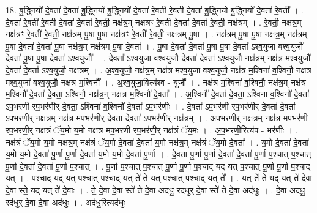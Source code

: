 \documentclass[17pt]{extarticle}
\begin{document}
18. बु॒द्ध्नियो॑ दे॒वता॑ दे॒वता॑ बु॒द्ध्नियो॑ बु॒द्ध्नियो॑ दे॒वता॑ रे॒वती॑ रे॒वती॑ दे॒वता॑ बु॒द्ध्नियो॑ बु॒द्ध्नियो॑ दे॒वता॑ रे॒वती᳚ । . दे॒वता॑ रे॒वती॑ रे॒वती॑ दे॒वता॑ दे॒वता॑ रे॒वती॒ नक्ष॑त्र॒म् नक्ष॑त्रꣳ रे॒वती॑ दे॒वता॑ दे॒वता॑ रे॒वती॒ नक्ष॑त्रम् । . रे॒वती॒ नक्ष॑त्र॒म् नक्ष॑त्रꣳ रे॒वती॑ रे॒वती॒ नक्ष॑त्रम् पू॒षा पू॒षा नक्ष॑त्रꣳ रे॒वती॑ रे॒वती॒ नक्ष॑त्रम् पू॒षा । . नक्ष॑त्रम् पू॒षा पू॒षा नक्ष॑त्र॒म् नक्ष॑त्रम् पू॒षा दे॒वता॑ दे॒वता॑ पू॒षा नक्ष॑त्र॒म् नक्ष॑त्रम् पू॒षा दे॒वता᳚ । . पू॒षा दे॒वता॑ दे॒वता॑ पू॒षा पू॒षा दे॒वता᳚ ऽश्व॒युजा॑ वश्व॒युजौ॑ दे॒वता॑ पू॒षा पू॒षा दे॒वता᳚ ऽश्व॒युजौ᳚ । . दे॒वता᳚ ऽश्व॒युजा॑ वश्व॒युजौ॑ दे॒वता॑ दे॒वता᳚ ऽश्व॒युजौ॒ नक्ष॑त्र॒म् नक्ष॑त्र मश्व॒युजौ॑ दे॒वता॑ दे॒वता᳚ ऽश्व॒युजौ॒ नक्ष॑त्रम् । . अ॒श्व॒युजौ॒ नक्ष॑त्र॒म् नक्ष॑त्र मश्व॒युजा॑ वश्व॒युजौ॒ नक्ष॑त्र म॒श्विना॑ व॒श्विनौ॒ नक्ष॑त्र मश्व॒युजा॑ वश्व॒युजौ॒ नक्ष॑त्र म॒श्विनौ᳚ । . अ॒श्व॒युजा॒वित्य॑श्व - युजौ᳚ । . नक्ष॑त्र म॒श्विना॑ व॒श्विनौ॒ नक्ष॑त्र॒म् नक्ष॑त्र म॒श्विनौ॑ दे॒वता॑ दे॒वता॒ ऽश्विनौ॒ नक्ष॑त्र॒न् 
नक्ष॑त्र म॒श्विनौ॑ दे॒वता᳚ । . अ॒श्विनौ॑ दे॒वता॑ दे॒वता॒ ऽश्विना॑ व॒श्विनौ॑ दे॒वता॑ ऽप॒भर॑णी रप॒भर॑णीर् दे॒वता॒ ऽश्विना॑ व॒श्विनौ॑ दे॒वता॑ ऽप॒भर॑णीः । . दे॒वता॑ ऽप॒भर॑णी रप॒भर॑णीर् दे॒वता॑ दे॒वता॑ ऽप॒भर॑णी॒र् नक्ष॑त्र॒म् नक्ष॑त्र मप॒भर॑णीर् दे॒वता॑ दे॒वता॑ ऽप॒भर॑णी॒र् नक्ष॑त्रम् । . अ॒प॒भर॑णी॒र् नक्ष॑त्र॒म् नक्ष॑त्र मप॒भर॑णी रप॒भर॑णी॒र् नक्ष॑त्रं ॅय॒मो य॒मो नक्ष॑त्र मप॒भर॑णी रप॒भर॑णी॒र् नक्ष॑त्रं ॅय॒मः । . अ॒प॒भर॑णी॒रित्य॑प - भर॑णीः । . नक्ष॑त्रं ॅय॒मो य॒मो नक्ष॑त्र॒म् नक्ष॑त्रं ॅय॒मो दे॒वता॑ दे॒वता॑ य॒मो नक्ष॑त्र॒म् नक्ष॑त्रं ॅय॒मो दे॒वता᳚ । . य॒मो दे॒वता॑ दे॒वता॑ य॒मो य॒मो दे॒वता॑ पू॒र्णा पू॒र्णा दे॒वता॑ य॒मो य॒मो दे॒वता॑ पू॒र्णा । . दे॒वता॑ पू॒र्णा पू॒र्णा दे॒वता॑ दे॒वता॑ पू॒र्णा प॒श्चात् प॒श्चात् पू॒र्णा दे॒वता॑ दे॒वता॑ पू॒र्णा प॒श्चात् । . पू॒र्णा प॒श्चात् प॒श्चात् पू॒र्णा पू॒र्णा प॒श्चाद् यद् यत् प॒श्चात् पू॒र्णा पू॒र्णा प॒श्चाद् यत् । . प॒श्चाद् यद् यत् प॒श्चात् प॒श्चाद् यत् ते॑ ते॒ यत् प॒श्चात् प॒श्चाद् यत् ते᳚ । . यत् ते॑ ते॒ यद् यत् ते॑ दे॒वा दे॒वा स्ते॒ यद् यत् ते॑ दे॒वाः । . ते॒ दे॒वा दे॒वा स्ते॑ ते दे॒वा अद॑धु॒ रद॑धुर् दे॒वा स्ते॑ ते दे॒वा अद॑धुः । . दे॒वा अद॑धु॒ रद॑धुर् दे॒वा दे॒वा अद॑धुः । . अद॑धु॒रित्यद॑धुः । \newline
\pagebreak
{}
\end{document}
